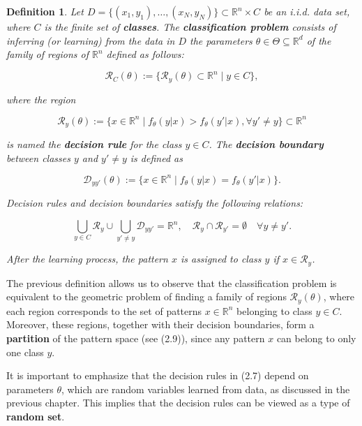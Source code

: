 \documentclass{report}
\newtheorem{definition}{Definition}[chapter]
\begin{document}
\begin{definition}
Let $D = \{(x_1,y_1),\dots,(x_N,y_N)\} \subset \mathbb{R}^n \times C$ be an i.i.d. data set, where $C$ is the finite set of \textbf{classes}. The \textbf{classification problem} consists of inferring (or learning) from the data in $D$ the parameters $\theta \in \Theta \subseteq \mathbb{R}^d$ of the family of regions of $\mathbb{R}^n$ defined as follows:

\begin{equation}
\mathcal{R}_C(\theta) := \{\mathcal{R}_y(\theta) \subset \mathbb{R}^n \mid y \in C\},
\end{equation}

where the region

\begin{equation}
\mathcal{R}_y(\theta) := \{x \in \mathbb{R}^n \mid f_\theta(y|x) > f_\theta(y'|x), \forall y' \neq y\} \subset \mathbb{R}^n
\end{equation}

is named the \textbf{decision rule} for the class $y \in C$. The \textbf{decision boundary} between classes $y$ and $y' \neq y$ is defined as

\begin{equation}
\mathcal{D}_{yy'}(\theta) := \{x \in \mathbb{R}^n \mid f_\theta(y|x) = f_\theta(y'|x)\}.
\end{equation}

Decision rules and decision boundaries satisfy the following relations:

\begin{equation}
\bigcup_{y \in C} \mathcal{R}_y \cup \bigcup_{y' \neq y} \mathcal{D}_{yy'} = \mathbb{R}^n, \quad \mathcal{R}_y \cap \mathcal{R}_{y'} = \emptyset \quad \forall y \neq y'.
\end{equation}

After the learning process, the pattern $x$ is assigned to class $y$ if $x \in \mathcal{R}_y$.
\end{definition}

The previous definition allows us to observe that the classification problem is equivalent to the geometric problem of finding a family of regions $\mathcal{R}_y(\theta)$, where each region corresponds to the set of patterns $x \in \mathbb{R}^n$ belonging to class $y \in C$. Moreover, these regions, together with their decision boundaries, form a \textbf{partition} of the pattern space (see (2.9)), since any pattern $x$ can belong to only one class $y$.

It is important to emphasize that the decision rules in (2.7) depend on parameters $\theta$, which are random variables learned from data, as discussed in the previous chapter. This implies that the decision rules can be viewed as a type of \textbf{random set}.
\end{document}
